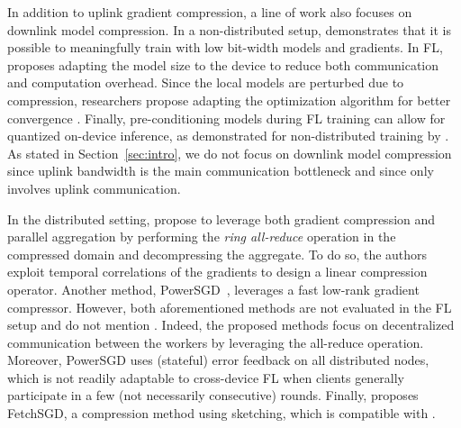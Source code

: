  In addition to uplink gradient compression, a line of work also focuses on downlink model compression. In a non-distributed setup, \cite{zhou2016dorefanet, courbariaux2015binaryconnect} demonstrates that it is possible to meaningfully train with low bit-width models and gradients. In FL, \cite{jiang2019model} proposes adapting the model size to the device to reduce both communication and computation overhead. Since the local models are perturbed due to compression, researchers propose adapting the optimization algorithm for better convergence \citep{liu2019double,sattler2019robust,tang2019doublesqueeze,zheng2019communicationefficient,amiri2020federated,philippenko2021preserved}.
Finally, pre-conditioning models during FL training can allow for quantized on-device inference, as demonstrated for non-distributed training by \cite{gupta2015deep, krishnamoorthi2018quantizing}. As stated in Section~\ref{sec:intro}, we do not focus on downlink model compression since uplink bandwidth is the main communication bottleneck and since \SecAgg only involves uplink communication.

 In the distributed setting, \cite{yu2018gradiveq} propose to leverage both gradient compression and parallel aggregation by performing the \emph{ring all-reduce} operation in the compressed domain and decompressing the aggregate. To do so, the authors exploit temporal correlations of the gradients to design a linear compression operator. 
Another method, PowerSGD~\citep{vogels2019powersgd}, leverages a fast low-rank gradient compressor. However, both aforementioned methods are not evaluated in the FL setup and do not mention \SecAgg. 
Indeed, the proposed methods focus on decentralized communication between the workers by leveraging the all-reduce operation. 
Moreover, PowerSGD uses (stateful) error feedback on all distributed nodes, which is not readily adaptable to cross-device FL when clients generally participate in a few (not necessarily consecutive) rounds.
Finally, \cite{rothchild2020fetchsgd} proposes FetchSGD, a compression method using sketching, which is compatible with \SecAgg.





